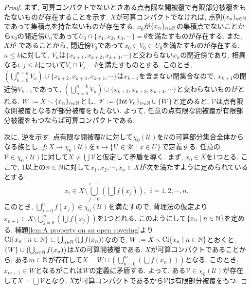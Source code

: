 \documentclass[uplatex, dvipdfmx, a4paper, 12pt, class=jsbook, crop=false]{standalone}
\begin{document}
\begin{proof}
	まず, 可算コンパクトでないときある点有限な開被覆で有限部分被覆をもたないものが存在することを示す. $ X $が可算コンパクトでなければ, 点列$ (x_n)_{n \in \mathbb{N}} $であって集積点を持たないものが存在する. $ x_0 $が$ \{x_n\}_{n \in \mathbb{N}} $の集積点でないことから$ x_0 $の開近傍$ U_0 $であって$ U_0 \cap \{x_1, x_2, x_3, \cdots\} = \emptyset $を満たすものが存在する. また, $ X $が  であることから, 閉近傍$ V_0 $であって$ x_0 \in V_0 \subset U_0 $を満たすものが存在する. $ n \leq k $に対して, $ V_n $は$ \{x_{k+1}, x_{k+2}, x_{k+3}, \cdots\}$と交わらない$ x_n $の閉近傍であり, 相異なる$ i, j \leq k $について$ V_i \cap V_j = \emptyset $を満たすものとする. このとき, $ \left(\bigcup_{n=0}^{n=k} V_{n} \right) \cup \{x_{k+2}, x_{k+3}, x_{k+4}, \cdots\} $は$ x_{k+1} $を含まない閉集合なので, $ x_{k+1} $の閉近傍$ V_{k+1} $であって, $ \left(\bigcup_{n=0}^{n=k} V_{n} \right) \cup \{x_{k+2}, x_{k+3}, x_{k+4}, \cdots\} $と交わらないものがとれる. $ W \mathrel{:=} X \smallsetminus \{x_n\}_{n \in \mathbb{N}} $とし, $ \mathscr{V} \mathrel{:=} \{\mathop{\mathrm{Int}}\nolimits V_n\}_{n \in \mathbb{N}} \cup \{W\} $と定めると, $ \mathscr{V} $は点有限な開被覆となるが部分被覆をもたない. よって, 任意の点有限な開被覆が有限部分被覆をもつならば可算コンパクトである.

	次に, 逆を示す. 点有限な開被覆$ \mathscr{U} $に対して$ \chi_0(\mathscr{U}) $を$ \mathscr{U} $の可算部分集合全体からなる族とし, $ f \colon X \to \chi_0(\mathscr{U}) $を$ x \mapsto \setcomp{U \in \mathscr{U}}{x \in U} $で定義する. 任意の$ \mathscr{V} \in \chi_0(\mathscr{U}) $に対して$ X \neq \bigcup \mathscr{V} $と仮定して矛盾を導く. まず, $ x_0 \in X $を1つとる. ここで, 1以上の$ n \in \mathbb{N} $に対して$ x_1, x_2, \cdots, x_n \in X $が次を満たすように定められているとする:
	$$ x_i \in X \setminus \bigcup_{j=0}^{i-1} \left(\bigcup f(x_j)\right), \ \ i = 1, 2, \cdots, n. $$
	このとき, $ \bigcup_{j=0}^{n} f(x_j) \in \chi_0(\mathscr{U}) $を満たすので, 背理法の仮定より$ x_{n+1} \in X \setminus \bigcup_{j=0}^{n} \left(\bigcup f(x_j)\right) $を1つとれる. このようにして$ \setcomp{x_n}{n \in \N} $を定める. 補題\ref{lem:A property on an open covering}より$ \topcl \setcomp{x_n}{n \in \N} \subset \bigcup_{n \in \N} \left(\bigcup f(x_n)\right) $なので, $ W \defeq X \setminus \topcl \setcomp{x_n}{n \in \N} $とおくと, $ \{W\} \cup \left(\bigcup_{n \in \mathbb{N}} f(x_n) \right) $は$ X $の可算開被覆である. $ X $が可算コンパクトであることから, ある$ m \in \mathbb{N} $が存在して$ X = W \cup \left(\bigcup_{n=0}^m \left(\bigcup f(x_n) \right)\right) $となる. このとき, $ x_{m+1} \in W $となるがこれは$ W $の定義に矛盾する. よって, ある$ \mathscr{V} \in \chi_0(\mathscr{U}) $が存在して$ X = \bigcup \mathscr{V} $となり, $ X $が可算コンパクトであるから$ \mathscr{V} $は有限部分被覆をもつ.
\end{proof}
\end{document}
